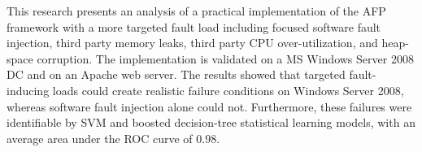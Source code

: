 This research presents an analysis of a practical implementation of the
\ac{AFP} framework with a more targeted fault load including focused software
fault injection, third party memory leaks, third party \ac{CPU}
over-utilization, and heap-space corruption. The implementation is validated on
a \ac{MS} Windows Server 2008 \ac{DC} and on an Apache web server.  The results
showed that targeted fault-inducing loads could create realistic failure
conditions on Windows Server 2008, whereas software fault injection alone could
not.  Furthermore, these failures were identifiable by \ac{SVM} and boosted
decision-tree statistical learning models, with an average area under the
\ac{ROC} curve of $0.98$.
